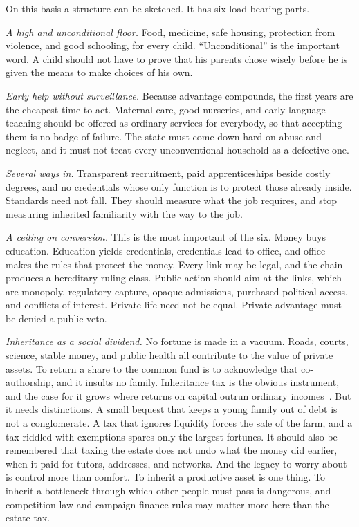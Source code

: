 \documentclass[12pt,a4paper]{book}
\begin{document}
On this basis a structure can be sketched. It has six load-bearing parts.

\emph{A high and unconditional floor.} Food, medicine, safe housing, protection from violence, and good schooling, for every child. ``Unconditional'' is the important word. A child should not have to prove that his parents chose wisely before he is given the means to make choices of his own.

\emph{Early help without surveillance.} Because advantage compounds, the first years are the cheapest time to act. Maternal care, good nurseries, and early language teaching should be offered as ordinary services for everybody, so that accepting them is no badge of failure. The state must come down hard on abuse and neglect, and it must not treat every unconventional household as a defective one.

\emph{Several ways in.} Transparent recruitment, paid apprenticeships beside costly degrees, and no credentials whose only function is to protect those already inside. Standards need not fall. They should measure what the job requires, and stop measuring inherited familiarity with the way to the job.

\emph{A ceiling on conversion.} This is the most important of the six. Money buys education. Education yields credentials, credentials lead to office, and office makes the rules that protect the money. Every link may be legal, and the chain produces a hereditary ruling class. Public action should aim at the links, which are monopoly, regulatory capture, opaque admissions, purchased political access, and conflicts of interest. Private life need not be equal. Private advantage must be denied a public veto.

\emph{Inheritance as a social dividend.} No fortune is made in a vacuum. Roads, courts, science, stable money, and public health all contribute to the value of private assets. To return a share to the common fund is to acknowledge that co-authorship, and it insults no family. Inheritance tax is the obvious instrument, and the case for it grows where returns on capital outrun ordinary incomes~\cite{Piketty2014}. But it needs distinctions. A small bequest that keeps a young family out of debt is not a conglomerate. A tax that ignores liquidity forces the sale of the farm, and a tax riddled with exemptions spares only the largest fortunes. It should also be remembered that taxing the estate does not undo what the money did earlier, when it paid for tutors, addresses, and networks. And the legacy to worry about is control more than comfort. To inherit a productive asset is one thing. To inherit a bottleneck through which other people must pass is dangerous, and competition law and campaign finance rules may matter more here than the estate tax.
\end{document}
